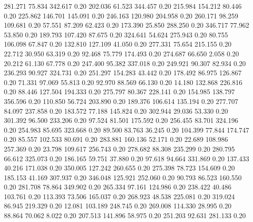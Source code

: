  281.271   75.834  342.617         0.20
 202.036   61.523  344.457         0.20
 215.984  154.212   80.446         0.20
 225.862  146.701  145.091         0.20
 246.163  120.980  204.958         0.20
 260.171   98.259  109.681         0.20
  57.551   87.209   62.423         0.20
 173.390   25.850  288.250         0.20
 346.717   77.962   53.850         0.20
 189.793  107.420   87.675         0.20
 324.641   54.624  275.943         0.20
  80.755  106.098   67.847         0.20
 132.810  127.109   41.050         0.20
 277.331   75.654  215.155         0.20
  22.712   30.950   63.319         0.20
  92.468   75.779  174.493         0.20
 274.687   66.650    2.058         0.20
  20.212   61.130   67.778         0.20
 247.400   95.382  337.018         0.20
 249.921   90.307   82.934         0.20
 236.293   90.927  324.731         0.20
 251.297  154.283   43.442         0.20
 178.492   86.975  126.867         0.20
  71.331   97.069   55.813         0.20
  92.970   88.569   66.130         0.20
  14.180  132.868  226.816         0.20
  88.446  127.504  194.333         0.20
 275.797   80.367  228.141         0.20
 154.985  138.797  356.596         0.20
 110.850   56.724  203.890         0.20
 189.376  106.614  135.194         0.20
 277.707   84.097  237.858         0.20
 183.572   77.188  145.824         0.20
 302.944   29.036   53.330         0.20
 301.392   96.500  233.206         0.20
  97.524   81.501  175.592         0.20
 256.455   83.701  324.196         0.20
 254.983   85.695  323.668         0.20
  89.500   83.763   36.245         0.20
 104.399   77.844  174.747         0.20
  85.557  102.533   80.691         0.20
 283.881  160.136   52.171         0.20
  22.689  108.986  257.369         0.20
  23.798  109.617  256.743         0.20
 278.682   88.308  235.299         0.20
 280.795   66.612  325.073         0.20
 186.165   59.751   37.880         0.20
  97.618   94.664  331.869         0.20
 137.433   40.216  171.038         0.20
 350.005  127.242  260.655         0.20
 275.398   78.723  154.609         0.20
 185.153   41.169  307.937         0.20
 346.048  125.921  252.060         0.20
  90.793   86.523  160.550         0.20
 281.708   78.864  349.902         0.20
 265.334   97.161  124.986         0.20
 238.422   40.486  103.761         0.20
 113.393   73.506  165.037         0.20
 268.923   48.538  225.081         0.20
 319.024   86.945  219.329         0.20
  12.081  103.189  248.745         0.20
 269.008  114.330   28.995         0.20
  88.864   70.062    8.022         0.20
 207.513  141.896   58.975         0.20
 251.203   92.631  281.133         0.20
